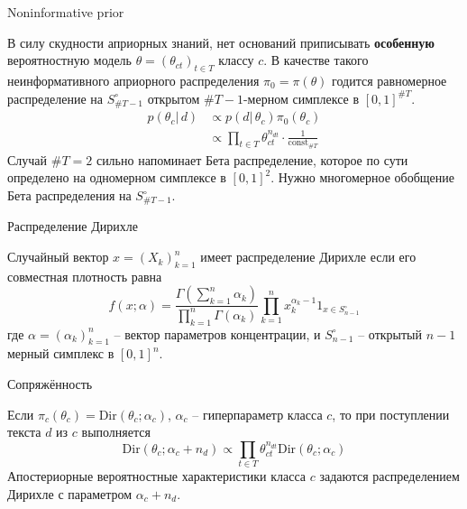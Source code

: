 \documentclass{beamer}
\newcommand{\eng}[1]{\foreignlanguage{english}{#1}}
\newcommand{\clo}[1]{\left [ #1 \right ]}
\newcommand{\brac}[1]{\left ( #1 \right )}
\newcommand{\induc}[1]{\left . #1 \right \vert}
\begin{document}
\begin{frame}
  \begin{block}{\eng{Noninformative prior}}

    В силу скудности априорных знаний, нет оснований приписывать \textbf{особенную} вероятностную модель $\theta = \brac{\theta_{ct}}_{t\in T}$ классу $c$.
    В качестве такого неинформативного априорного распределения $\pi_0=\pi(\theta)$ годится равномерное распределение на $S_{\#T-1}^\circ$ открытом $\#T-1$-мерном симплексе в $\clo{0,1}^{\#T}$.
    \begin{align*}
      p\brac{\induc{\theta_c}\,d} & \propto p\brac{\induc{d}\,\theta_c}\pi_0(\theta_c) \\
        & \propto \prod_{t\in T}\theta_{ct}^{n_{dt}} \cdot \frac{1}{\text{const}_{\#T}}
    \end{align*}
    Случай $\#T=2$ сильно напоминает Бета распределение, которое по сути определено на одномерном симплексе в $\clo{0,1}^2$.
    Нужно многомерное обобщение Бета распределения на $S_{\#T-1}^\circ$.
  \end{block}
\end{frame}

\begin{frame}
  \begin{block}{Распределение Дирихле}

    Случайный вектор $x=\brac{X_k}_{k=1}^n$ имеет распределение Дирихле если его совместная плотность равна
    \[f\brac{x;\alpha} = \frac{\Gamma\brac{\sum_{k=1}^n\alpha_k}}{\prod_{k=1}^n \Gamma(\alpha_k)} \prod_{k=1}^n x_k^{\alpha_k-1} 1_{x\in S_{n-1}^\circ}\]
    где $\alpha = \brac{\alpha_k}_{k=1}^n$ -- вектор параметров концентрации, и $S_{n-1}^\circ$ -- открытый $n-1$ мерный симплекс в $\clo{0,1}^n$.
  \end{block}
  \begin{block}{Сопряжённость}

    Если $\pi_c(\theta_c) = \text{Dir}\brac{\theta_c;\alpha_c}$, $\alpha_c$ -- гиперпараметр класса $c$, то при поступлении текста $d$ из $c$ выполняется
    \[\text{Dir}\brac{\theta_c; \alpha_c+n_d} \propto \prod_{t\in T}\theta_{ct}^{n_{dt}} \text{Dir}\brac{\theta_c; \alpha_c}\]
    Апостериорные вероятностные характеристики класса $c$ задаются распределением Дирихле с параметром $\alpha_c + n_d$.
  \end{block}
\end{frame}
\end{document}
